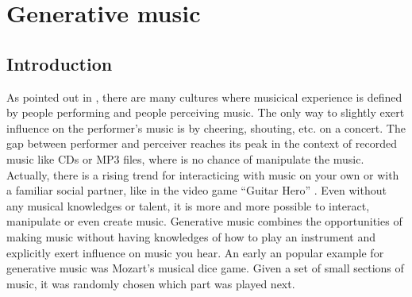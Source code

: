 	 \begin{acronym}[Soundgates]
	 \end{acronym}
	 

	\section{Generative music}
	

	\subsection{Introduction}

	As pointed out in \cite{Chandra2012}, there are many cultures where musicical experience is defined by people performing and people perceiving music. 
	The only way to slightly exert influence on the performer's music is by cheering, shouting, etc. on a concert. 
	The gap between performer and perceiver reaches its peak in the context of recorded music like CDs or MP3 files, where is no chance of manipulate the music. 
	Actually, there is a rising trend for interacticing with music on your own or with a familiar social partner, like in the video game "`Guitar Hero"' \cite{Chandra2012, Planck2009}. 
	Even without any musical knowledges or talent, it is more and more possible to interact, manipulate or even create music.
	Generative music combines the opportunities of making music without having knowledges of how to play an instrument and explicitly exert influence on music you hear.
	An early an popular example for generative music was Mozart's musical dice game. Given a set of small sections of music, it was randomly chosen which part was played next.


